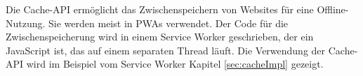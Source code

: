 
Die Cache-API ermöglicht das Zwischenspeichern von Websites für eine Offline-Nutzung. Sie werden meist in PWAs verwendet. Der Code für die Zwischenspeicherung wird in einem Service Worker geschrieben, der ein JavaScript ist, das auf einem separaten Thread läuft. Die Verwendung der Cache-API wird im Beispiel vom Service Worker Kapitel \ref{sec:cacheImpl} gezeigt.
